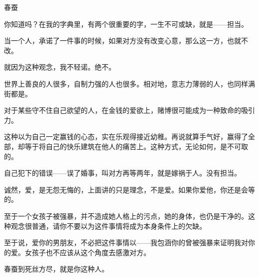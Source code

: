 \begin{center}
    \par 春蚕
\end{center}
\par {}
\par 你知道吗？在我的字典里，有两个很重要的字，一生不可或缺，就是——担当。
\par 当一个人，承诺了一件事的时候，如果对方没有改变心意，那么这一方，也就不改。
\par 就因为这种观念，我不轻诺。绝不。
\par 世界上善良的人很多，自制力强的人也很多。相对地，意志力薄弱的人，也同样满街都是。
\par 对于某些守不住自己欲望的人，在金钱的爱欲上，赌博很可能成为一种致命的吸引力。
\par 这种以为自己一定赢钱的心态，实在乐观得接近幼稚。再说就算手气好，赢得了全部，却等于将自己的快乐建筑在他人的痛苦上。这种方式，无论如何，是不可取的。
\par 自己犯下的错误——误了婚事，叫对方再等两年，就是嫁祸于人。没有担当。
\par 诚然，爱，是无怨无悔的，上面讲的只是理念，不是爱。如果你爱他，你还是会等的。
\par 至于一个女孩子被强暴，并不造成她人格上的污点，她的身体，也仍是干净的。这种观念很普通，请你不要以为这件事情将成为本身条件上的欠缺。
\par 至于说，爱你的男朋友，不必把这件事情以——我包涵你的曾被强暴来证明我对你的爱。女孩子也不应该从这个角度去感激对方。
\par 春蚕到死丝方尽，就是你这种人。
\par {}

